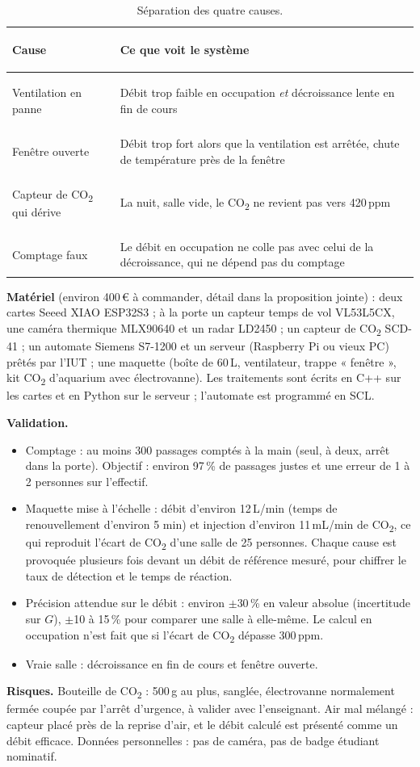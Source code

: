 \documentclass[10pt,a4paper]{article}
\renewcommand{\arraystretch}{1.2}
\newcommand{\COtwo}{CO\textsubscript{2}}
\begin{document}
\begin{table}[ht]
\centering
\footnotesize
\renewcommand{\arraystretch}{1.06}
\begin{tabularx}{\linewidth}{>{\bfseries\raggedright\arraybackslash}p{3.6cm} X}
\toprule
\textbf{Cause} & \textbf{Ce que voit le système}\\
\midrule
Ventilation en panne & Débit trop faible en occupation \emph{et} décroissance lente en fin de cours \\
Fenêtre ouverte & Débit trop fort alors que la ventilation est arrêtée, chute de température près de la fenêtre \\
Capteur de \COtwo{} qui dérive & La nuit, salle vide, le \COtwo{} ne revient pas vers 420\,ppm \\
Comptage faux & Le débit en occupation ne colle pas avec celui de la décroissance, qui ne dépend pas du comptage \\
\bottomrule
\end{tabularx}
\caption{Séparation des quatre causes.}
\label{tab:causes}
\end{table}

\textbf{Matériel} (environ 400\,\euro{} à commander, détail dans la proposition jointe) : deux cartes Seeed XIAO ESP32S3 ; à la porte un capteur temps de vol VL53L5CX, une caméra thermique MLX90640 et un radar LD2450 ; un capteur de \COtwo{} SCD-41 ; un automate Siemens S7-1200 et un serveur (Raspberry Pi ou vieux PC) prêtés par l'IUT ; une maquette (boîte de 60\,L, ventilateur, trappe « fenêtre », kit \COtwo{} d'aquarium avec électrovanne). Les traitements sont écrits en C++ sur les cartes et en Python sur le serveur ; l'automate est programmé en SCL.

\textbf{Validation.}
\begin{itemize}[leftmargin=1.3em,itemsep=0pt,topsep=1pt]
  \item Comptage : au moins 300 passages comptés à la main (seul, à deux, arrêt dans la porte). Objectif : environ 97\,\% de passages justes et une erreur de 1 à 2 personnes sur l'effectif.
  \item Maquette mise à l'échelle : débit d'environ 12\,L/min (temps de renouvellement d'environ 5 min) et injection d'environ 11\,mL/min de \COtwo, ce qui reproduit l'écart de \COtwo{} d'une salle de 25 personnes. Chaque cause est provoquée plusieurs fois devant un débit de référence mesuré, pour chiffrer le taux de détection et le temps de réaction.
  \item Précision attendue sur le débit : environ $\pm$30\,\% en valeur absolue (incertitude sur $G$), $\pm$10 à 15\,\% pour comparer une salle à elle-même. Le calcul en occupation n'est fait que si l'écart de \COtwo{} dépasse 300\,ppm.
  \item Vraie salle : décroissance en fin de cours et fenêtre ouverte.
\end{itemize}

\textbf{Risques.} Bouteille de \COtwo{} : 500\,g au plus, sanglée, électrovanne normalement fermée coupée par l'arrêt d'urgence, à valider avec l'enseignant. Air mal mélangé : capteur placé près de la reprise d'air, et le débit calculé est présenté comme un débit efficace. Données personnelles : pas de caméra, pas de badge étudiant nominatif.
\end{document}
